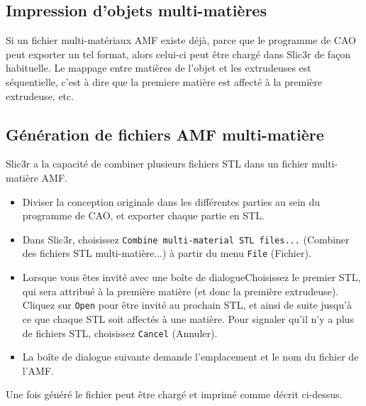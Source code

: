 

\subsection{Impression d'objets multi-mati\`eres} %
\label{sub:printing_multi_material_objects}

Si un fichier multi-mat\'eriaux AMF existe d\'ej\`a, parce que le programme de CAO peut exporter un tel format, alors celui-ci peut \^etre charg\'e dans Slic3r de façon habituelle. Le mappage entre mati\`eres de l'objet et les extrudeuses est s\'equentielle, c'est \`a dire que la premiere mati\`ere est affect\'e \`a la premi\`ere extrudeuse, etc.



\subsection{G\'en\'eration de fichiers AMF multi-mati\`ere} %
\label{sub:generating_multi_material_amf_files}

Slic3r a la capacit\'e de combiner plusieurs fichiers STL dans un fichier multi-mati\`ere AMF.


\begin{itemize}
    \item Diviser la conception originale dans les diff\'erentes parties au sein du programme de CAO, et exporter chaque partie en STL.
    \item Dans Slic3r, choisissez \texttt{Combine multi-material STL files...} (Combiner des fichiers STL multi-mati\`ere...) \`a partir du menu \texttt{File} (Fichier).
    \item Lorsque vous \^etes invit\'e avec une bo\^ite de dialogueChoisissez le premier STL, qui sera attribu\'e \`a la premi\`ere mati\`ere (et donc la premi\`ere extrudeuse). Cliquez sur \texttt{Open} pour \^etre invit\'e au prochain STL, et ainsi de suite jusqu'\`a ce que chaque STL soit affect\'es \`a une mati\`ere. Pour signaler qu'il n'y a plus de fichiers STL, choisissez \texttt{Cancel} (Annuler).
    \item La bo\^ite de dialogue suivante demande l'emplacement et le nom du fichier de l'AMF.
\end{itemize}

Une fois g\'en\'er\'e le fichier peut \^etre charg\'e et imprim\'e comme d\'ecrit ci-dessus.


